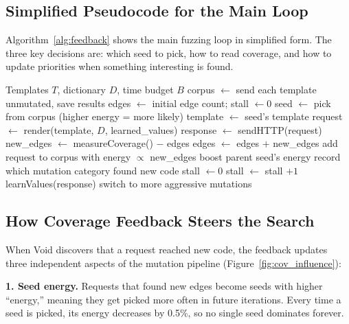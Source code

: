 \documentclass[conference]{IEEEtran}
\begin{document}
\subsection{Simplified Pseudocode for the Main Loop}

Algorithm~\ref{alg:feedback} shows the main fuzzing loop in simplified form. The three key decisions are: which seed to pick, how to read coverage, and how to update priorities when something interesting is found.

\begin{algorithm}[t]
\caption{Coverage-Guided Fuzzing Loop (Simplified)}
\label{alg:feedback}
\begin{algorithmic}[1]
\REQUIRE Templates $T$, dictionary $D$, time budget $B$
\STATE corpus $\leftarrow$ send each template unmutated, save results
\STATE edges $\leftarrow$ initial edge count; stall $\leftarrow 0$
    \STATE seed $\leftarrow$ pick from corpus (higher energy = more likely)
    \STATE template $\leftarrow$ seed's template
    \STATE request $\leftarrow$ render(template, $D$, learned\_values)
    \STATE response $\leftarrow$ sendHTTP(request)
    \STATE new\_edges $\leftarrow$ measureCoverage() $-$ edges
        \STATE edges $\leftarrow$ edges $+$ new\_edges
        \STATE add request to corpus with energy $\propto$ new\_edges
        \STATE boost parent seed's energy
        \STATE record which mutation category found new code
        \STATE stall $\leftarrow 0$
    \ELSE
        \STATE stall $\leftarrow$ stall $+ 1$
    \ENDIF
    \STATE learnValues(response)  
        \STATE switch to more aggressive mutations
    \ENDIF
\ENDWHILE
\end{algorithmic}
\end{algorithm}

\subsection{How Coverage Feedback Steers the Search}
\label{sec:coverage_influence}

When Void discovers that a request reached new code, the feedback updates three independent aspects of the mutation pipeline (Figure~\ref{fig:cov_influence}):

\textbf{1. Seed energy.} Requests that found new edges become seeds with higher ``energy,'' meaning they get picked more often in future iterations. Every time a seed is picked, its energy decreases by 0.5\%, so no single seed dominates forever.
\end{document}
